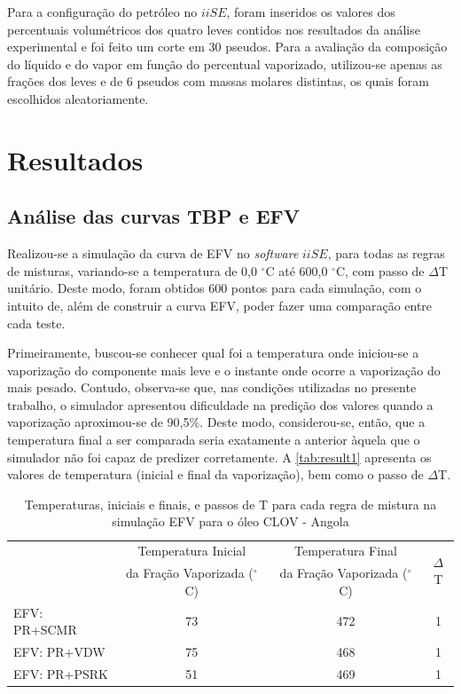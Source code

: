 Para a configuração do petróleo no $iiSE$, foram inseridos os valores dos
percentuais volumétricos dos quatro leves contidos nos resultados da análise experimental e
foi feito um corte em 30 pseudos. Para a avaliação da composição do líquido e do
vapor em função do percentual vaporizado, utilizou-se apenas as frações dos
leves e de 6 pseudos com massas molares distintas, os quais foram escolhidos
aleatoriamente.

\clearpage 

\section{Resultados}

\subsection{Análise das curvas TBP e EFV} 

Realizou-se a simulação da curva de EFV no \emph{software} $iiSE$, para todas as
regras de misturas, variando-se a temperatura de 0,0 $^\circ$C até 600,0
$^\circ$C, com passo de $\Delta$T unitário. Deste modo, foram obtidos 600 pontos
para cada simulação, com o intuito de, além de construir a curva EFV, poder
fazer uma comparação entre cada teste.

Primeiramente, buscou-se conhecer qual foi a temperatura onde iniciou-se a
vaporização do componente mais leve e o instante onde ocorre a vaporização do
mais pesado. Contudo, observa-se que, nas condições utilizadas no presente
trabalho, o simulador apresentou dificuldade na predição dos valores quando a
vaporização aproximou-se de 90,5{\%}. Deste modo, considerou-se, então, que a
temperatura final a ser comparada seria exatamente a anterior àquela que o
simulador não foi capaz de predizer corretamente. A \autoref{tab:result1}
apresenta os valores de temperatura (inicial e final da vaporização), bem como o
passo de $\Delta$T.

\begin{table}[htb]
\renewcommand{\arraystretch}{1.3}
\caption{Temperaturas, iniciais e finais, e passos de T para cada regra de
mistura na simulação EFV para o óleo CLOV - Angola}
\footnotesize
\center 
\begin{tabular}{lccc}   
\toprule
   &{Temperatura Inicial}&{Temperatura Final}&\multirow{2}{*}{$\Delta$T} \\
  &{da Fração Vaporizada ($^\circ$C)}&{da Fração Vaporizada
   ($^\circ$C)} & \\
\midrule 
{EFV: PR+SCMR}	&	73	&	472		&	1 \\
{EFV: PR+VDW}	&	75	&	468		&	1 \\
{EFV: PR+PSRK}	&	51	&	469		&	1 \\
\bottomrule
\end{tabular}
\label{tab:result1}
\end{table}

